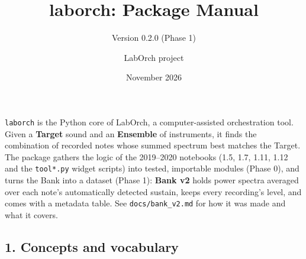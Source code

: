 \documentclass[
  10pt,
]{article}
\title{laborch: Package Manual}
\subtitle{Version 0.2.0 (Phase 1)}
\author{LabOrch project}
\date{November 2026}
\begin{document}
\maketitle

{
\hypersetup{linkcolor=}
\setcounter{tocdepth}{2}
\tableofcontents
}
\texttt{laborch} is the Python core of LabOrch, a
computer-assisted orchestration tool. Given a
\textbf{Target} sound and an \textbf{Ensemble} of
instruments, it finds the combination of recorded notes
whose summed spectrum best matches the Target. The package
gathers the logic of the 2019--2020 notebooks (1.5, 1.7,
1.11, 1.12 and the \texttt{tool*.py} widget scripts) into
tested, importable modules (Phase 0), and turns the Bank
into a dataset (Phase 1): \textbf{Bank v2} holds power
spectra averaged over each note's automatically detected
sustain, keeps every recording's level, and comes with a
metadata table. See \texttt{docs/bank\_v2.md} for how it was
made and what it covers.

\subsection{1. Concepts and vocabulary}
\end{document}
